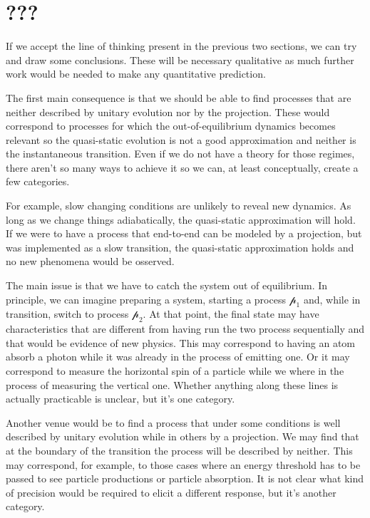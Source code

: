 \documentclass[11pt]{article}
\begin{document}
\section{???}

If we accept the line of thinking present in the previous two sections, we can try and draw some conclusions. These will be necessary qualitative as much further work would be needed to make any quantitative prediction.

The first main consequence is that we should be able to find processes that are neither described by unitary evolution nor by the projection. These would correspond to processes for which the out-of-equilibrium dynamics becomes relevant so the quasi-static evolution is not a good approximation and neither is the instantaneous transition. Even if we do not have a theory for those regimes, there aren't so many ways to achieve it so we can, at least conceptually, create a few categories.

For example, slow changing conditions are unlikely to reveal new dynamics. As long as we change things adiabatically, the quasi-static approximation will hold. If we were to have a process that end-to-end can be modeled by a projection, but was implemented as a slow transition, the quasi-static approximation holds and no new phenomena would be osserved.

The main issue is that we have to catch the system out of equilibrium. In principle, we can imagine preparing a system, starting a process $\mathcal{p}_1$ and, while in transition, switch to process $\mathcal{p}_2$. At that point, the final state may have characteristics that are different from having run the two process sequentially and that would be evidence of new physics. This may correspond to having an atom absorb a photon while it was already in the process of emitting one. Or it may correspond to measure the horizontal spin of a particle while we where in the process of measuring the vertical one. Whether anything along these lines is actually practicable is unclear, but it's one category.

Another venue would be to find a process that under some conditions is well described by unitary evolution while in others by a projection. We may find that at the boundary of the transition the process will be described by neither. This may correspond, for example, to those cases where an energy threshold has to be passed to see particle productions or particle absorption. It is not clear what kind of precision would be required to elicit a different response, but it's another category. 
\end{document}
